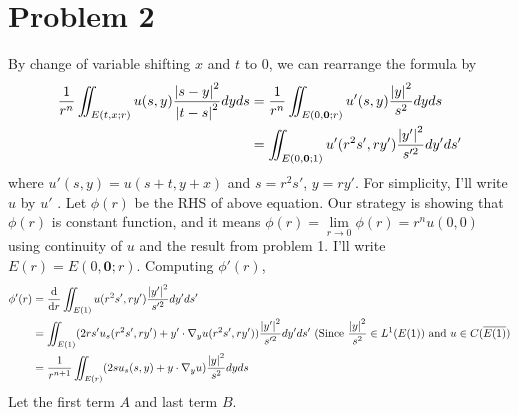 \documentclass{article}
\begin{document}
\section*{Problem 2}
By change of variable shifting $x$ and $t$ to 0, we can rearrange the formula by 
\begin{equation*}
\begin{split}
\frac{1}{r^n}\iint_{E(t,x;r)}u(s,y)\frac{\abs{s-y}^2}{\abs{t-s}^2}dyds&=\frac{1}{r^n}\iint_{E(0,\bm{0};r)}u'(s,y)\frac{\abs{y}^2}{s^2}dyds\\
&=\iint_{E(0,\bm{0};1)}u'(r^2s',ry')\frac{\abs{y'}^2}{s'^2}dy'ds'
\end{split}
\end{equation*}
where $u'(s,y)=u(s+t, y+x)$ and $s=r^2s'$, $y=ry'$. For simplicity, I'll write $u$ by $u'$
.
Let $\phi(r)$ be the RHS of above equation. Our strategy is showing that $\phi(r)$ is constant function, and it means $\phi(r)=\lim\limits_{r\rightarrow 0} \phi(r)=r^n u(0,0)$ using continuity of $u$ and the result from problem 1. I'll write $E(r)=E(0,\bm{0};r)$.
Computing $\phi'(r)$,
\begin{equation*}
\begin{split}
\phi'(r)&=\dv{r}\iint_{E(1)} u(r^2s',ry')\frac{\abs{y'}^2}{s'^2}dy'ds' \\
&= \iint_{E(1)}(2rs'u_s(r^2s', ry')+y'\cdot \nabla_y u(r^2s', ry'))\frac{\abs{y'}^2}{s'^2}dy'ds' \text { (Since }\frac{\abs{y}^2}{s^2}\in L^1(E(1)) \text{ and } u\in C(\overline{E(1)}) \\
&= \frac{1}{r^{n+1}}\iint_{E(r)}(2su_s(s,y)+y\cdot \nabla_y u)\frac{\abs{y}^2}{s^2}dyds
\end{split}
\end{equation*}
Let the first term $A$ and last term $B$.
\end{document}
